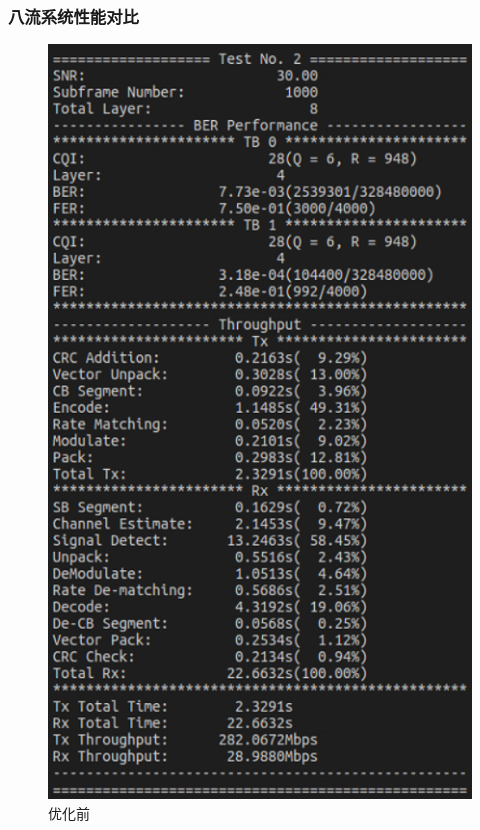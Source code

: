 \documentclass{article}
\begin{document}
\subsubsection{八流系统性能对比}
\begin{figure}[H]
	\centering
	\begin{minipage}[t]{0.48\textwidth}
		\centering
		\includegraphics[width = \textwidth]{comp8.png}
		\caption{优化前}
	\end{minipage}
	\begin{minipage}[t]{0.48\textwidth}

\end{minipage}
\end{figure}
\end{document}
